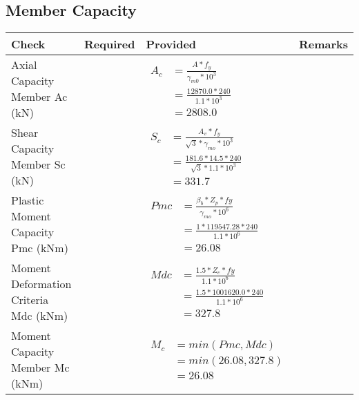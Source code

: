 \documentclass{article}%
\begin{document}
\subsection{Member Capacity}%
\label{subsec:MemberCapacity}%
\renewcommand{\arraystretch}{1.2}%
\begin{longtable}{|p{4cm}|p{5cm}|p{5.5cm}|p{1.5cm}|}%
\hline%
\rowcolor{OsdagGreen}%
Check&Required&Provided&Remarks\\%
\hline%
\endhead%
\hline%
Axial Capacity Member Ac (kN)&&$\begin{aligned} A_c &=\frac{A*f_y}{\gamma_{m0} *10^3}\\ &=\frac{12870.0*240}{1.1* 10^3}\\ &=2808.0\end{aligned}$&\\%
\hline%
Shear Capacity Member Sc (kN)&&$\begin{aligned} S_c &= \frac{A_v*f_y}{\sqrt{3}*\gamma_{mo} *10^3}\\ &=\frac{181.6*14.5*240}{\sqrt{3}*1.1 *10^3}\\ &=331.7\end{aligned}$&\\%
\hline%
Plastic Moment Capacity Pmc (kNm)&&$\begin{aligned} Pmc &= \frac{\beta_b * Z_p *fy}{\gamma_{mo} * 10^6}\\ &=\frac{1*119547.28*240}{1.1 * 10^6}\\ &=26.08\end{aligned}$&\\%
\hline%
Moment Deformation Criteria Mdc (kNm)&&$\begin{aligned} Mdc &= \frac{1.5 *Z_e *fy}{1.1* 10^6}\\ &= \frac{1.5 *1001620.0*240}{1.1* 10^6}\\ &= 327.8\end{aligned}$&\\%
\hline%
Moment Capacity Member Mc (kNm)&&$\begin{aligned} M_c &= min(Pmc,Mdc)\\ &=min(26.08,327.8)\\ &=26.08\end{aligned}$&\\%
\hline%
\end{longtable}

%
\newpage%
\end{document}
